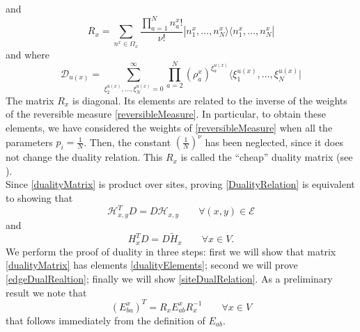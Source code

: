 \documentclass[11pt]{article}
\numberwithin{equation}{section}
\numberwithin{equation}{subsection}
\newcommand{\dd}{\mathcal{D}_{u(x)}}
\begin{document}
and
\begin{equation}\label{Revmatrix}
    R_{x}=\sum_{n^{x}\in\Omega_{x}}\frac{\prod_{a=1}^{N}n_{a}^{x}!}{\nu!}|n_{1}^{x},\ldots,n_{N}^{x}\rangle\langle n_{1}^{x},\ldots,n_{N}^{x}|
\end{equation}
and where 
\begin{equation}\label{dualityMatrix2}
\dd=\sum_{\xi_{2}^{u(x)},\ldots,\xi_{N}^{u(x)}=0}^{\infty}\prod_{a=2}^{N}\left(\rho_{a}^{x}\right)^{\xi_{a}^{u(x)}}\langle \xi_{1}^{u(x)},\ldots,\xi_{N}^{u(x)}|
\end{equation}
The matrix $R_{x}$ is diagonal. Its elements are related to the inverse of the weights of the reversible measure \eqref{reversibleMeasure}. In particular, to obtain these elements, we have considered the weights of \eqref{reversibleMeasure} when all the parameters $p_{i}=\frac{1}{N}$. Then, the constant $\left(\frac{1}{N}\right)^{\nu}$ has been neglected, since it does not change the duality relation. This $R_{x}$ is called the ``cheap'' duality matrix (see \cite{giardina2009duality}). \\
Since \eqref{dualityMatrix} is product over sites, proving \eqref{DualityRelation} is equivalent to showing that 
\begin{equation}\label{edgeDualRealtion}
    \mathcal{H}_{x,y}^{T}D=D\mathcal{H}_{x,y}\qquad \forall (x,y)\in \mathcal{E}
\end{equation}
and 
\begin{equation}\label{siteDualRelation}
    H_{x}^{T}D=D\widetilde{H}_{x}\qquad \forall x\in V.
\end{equation}
We perform the proof of duality in three steps: first we will show that matrix \eqref{dualityMatrix} has elements \eqref{dualityElements}; second we will prove \eqref{edgeDualRealtion}; finally we will show \eqref{siteDualRelation}. 
As a preliminary result we note that 
\begin{equation}\label{transpositionPropertyR}
(E_{ba}^{x})^{T}=R_{x}E_{ab}^{x}R_{x}^{-1}\qquad \forall x\in V
\end{equation}
that follows immediately from the definition of $E_{ab}$. 

\end{document}
